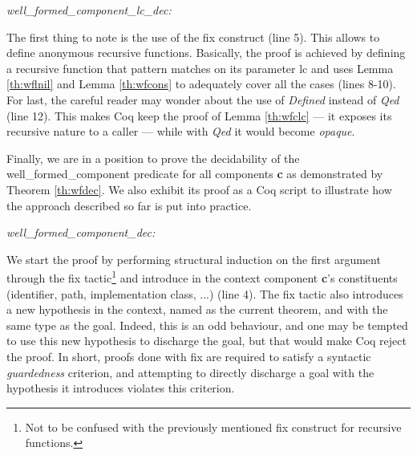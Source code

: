 	\begin{lemma} \label{th:wfclc} \textit{well_formed_component_lc_dec:}
		\vspace{-0.2cm}
		 
		
	\end{lemma}	
	
	\noindent  The first thing to note is the use of the \textsf{fix} construct (line 5). This allows
	to define anonymous recursive functions. Basically, the proof is achieved by defining
	a recursive function that pattern matches on its parameter \textsf{lc} and uses Lemma \ref{th:wflnil}
	and Lemma \ref{th:wfcons} to adequately cover all the cases (lines 8-10). For last, the careful reader may 
	wonder about the use of \textit{Defined} instead of \textit{Qed} (line 12). 
	This makes Coq keep the proof of Lemma \ref{th:wfclc} --- it exposes its 
	recursive nature to a caller --- while with \textit{Qed} it would become 
	\textit{opaque}. 
		
		Finally, we are in a position to prove the decidability of the \textsf{well\_formed\_component}	
	predicate for all \textsf{component}s \textbf{c} as demonstrated by Theorem \ref{th:wfdec}. 
	We also exhibit its proof as a Coq script 
	to illustrate how the approach described so far is put into practice.	
	
	\begin{theorem} \label{th:wfdec} \textit{well_formed_component_dec:}
	\vspace{-0.2cm}
			
	\end{theorem}

	\noindent We start the proof by performing structural induction on the first argument through
	the \textsf{fix} tactic\footnote{Not to be confused with the previously mentioned 
	\textsf{fix} construct for recursive functions.} and introduce in the 
	context \textsf{component} \textbf{c}'s constituents (identifier, path, implementation class, ...) (line 4). 
	The \textsf{fix} tactic also introduces a new hypothesis in the context, 
	named as the current theorem, and with the same type as the goal. Indeed, this is an odd
	behaviour, and one may be tempted to use this new hypothesis to discharge the goal, but that would make
	Coq reject the proof. In short, proofs done with \textsf{fix} are required to satisfy a syntactic 
	\textit{guardedness} criterion, and attempting to directly discharge a goal with the hypothesis it
	introduces violates this criterion.	
	
